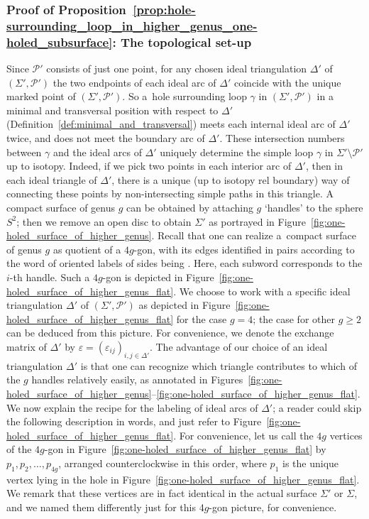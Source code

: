 \documentclass[pdftex]{sigma}
\numberwithin{equation}{section}
\theoremstyle{definition}
\begin{document}
\subsubsection{Proof of Proposition~\ref{prop:hole-surrounding_loop_in_higher_genus_one-holed_subsurface}: The topological set-up}
Since $\mathcal{P}'$ consists of just one point, for any chosen ideal triangulation $\Delta'$ of $(\Sigma',\mathcal{P}')$ the two endpoints of each ideal arc of $\Delta'$ coincide with the unique marked point of $(\Sigma',\mathcal{P}')$. So a~hole surrounding loop $\gamma$ in $(\Sigma',\mathcal{P}')$ in a minimal and transversal position with respect to $\Delta'$ (Definition~\ref{def:minimal_and_transversal}) meets each internal ideal arc of $\Delta'$ twice, and does not meet the boundary arc of $\Delta'$. These intersection numbers between $\gamma$ and the ideal arcs of $\Delta'$ uniquely determine the simple loop $\gamma$ in $\Sigma'\setminus\mathcal{P}'$ up to isotopy. Indeed, if we pick two points in each interior arc of $\Delta'$, then in each ideal triangle of $\Delta'$, there is a unique (up to isotopy rel boundary) way of connecting these points by non-intersecting simple paths in this triangle.
A compact surface of genus $g$ can be obtained by attaching $g$ `handles' to the sphere $S^2$; then we remove an open disc to obtain $\Sigma'$ as portrayed in Figure~\ref{fig:one-holed_surface_of_higher_genus}. Recall that one can realize a~compact surface of genus $g$ as quotient of a $4g$-gon, with its edges identified in pairs according to the word of oriented labels of sides being . Here, each subword  corresponds to the $i$-th handle. Such a $4g$-gon is depicted in Figure~\ref{fig:one-holed_surface_of_higher_genus_flat}.
We choose to work with a specific ideal triangulation $\Delta'$ of $(\Sigma',\mathcal{P}')$ as depicted in Figure~\ref{fig:one-holed_surface_of_higher_genus_flat} for the case $g=4$; the case for other $g\ge 2$ can be deduced from this picture. For convenience, we denote the exchange matrix of $\Delta'$ by $\varepsilon = (\varepsilon_{ij})_{i,j\in \Delta'}$. The advantage of our choice of an ideal triangulation $\Delta'$ is that one can recognize which triangle contributes to which of the $g$ handles relatively easily, as annotated in Figures~\ref{fig:one-holed_surface_of_higher_genus}--\ref{fig:one-holed_surface_of_higher_genus_flat}. We now explain the recipe for the labeling of ideal arcs of $\Delta'$; a reader could skip the following description in words, and just refer to Figure~\ref{fig:one-holed_surface_of_higher_genus_flat}. For convenience, let us call the $4g$ vertices of the $4g$-gon in Figure~\ref{fig:one-holed_surface_of_higher_genus_flat} by $p_1,p_2,\dots,p_{4g}$, arranged counterclockwise in this order, where $p_1$ is the unique vertex lying in the hole in Figure~\ref{fig:one-holed_surface_of_higher_genus_flat}. We remark that these vertices are in fact identical in the actual surface $\Sigma'$ or $\Sigma$, and we named them differently just for this 4$g$-gon picture, for convenience.
\end{document}
